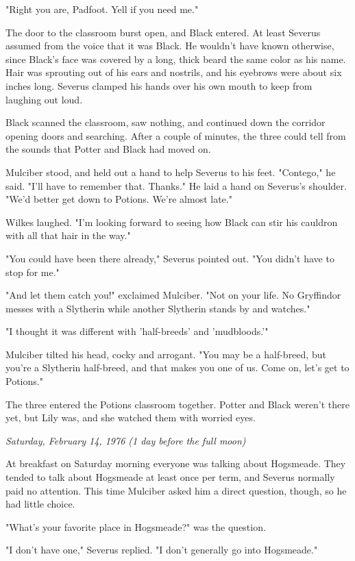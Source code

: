 \documentclass[a4paper,11pt]{article}
\begin{document}
"Right you are, Padfoot. Yell if you need me."

The door to the classroom burst open, and Black entered. At least Severus assumed from the voice that it was Black. He wouldn't have known otherwise, since Black's face was covered by a long, thick beard the same color as his name. Hair was sprouting out of his ears and nostrils, and his eyebrows were about six inches long. Severus clamped his hands over his own mouth to keep from laughing out loud.

Black scanned the classroom, saw nothing, and continued down the corridor opening doors and searching. After a couple of minutes, the three could tell from the sounds that Potter and Black had moved on.

Mulciber stood, and held out a hand to help Severus to his feet. "Contego," he said. "I'll have to remember that. Thanks." He laid a hand on Severus's shoulder. "We'd better get down to Potions. We're almost late."

Wilkes laughed. "I'm looking forward to seeing how Black can stir his cauldron with all that hair in the way."

"You could have been there already," Severus pointed out. "You didn't have to stop for me."

"And let them catch you!" exclaimed Mulciber. "Not on your life. No Gryffindor messes with a Slytherin while another Slytherin stands by and watches."

"I thought it was different with 'half-breeds' and 'mudbloods.'"

Mulciber tilted his head, cocky and arrogant. "You may be a half-breed, but you're a Slytherin half-breed, and that makes you one of us. Come on, let's get to Potions."

The three entered the Potions classroom together. Potter and Black weren't there yet, but Lily was, and she watched them with worried eyes.

\emph{Saturday, February 14, 1976 (1 day before the full moon)}

At breakfast on Saturday morning everyone was talking about Hogsmeade. They tended to talk about Hogsmeade at least once per term, and Severus normally paid no attention. This time Mulciber asked him a direct question, though, so he had little choice.

"What's your favorite place in Hogsmeade?" was the question.

"I don't have one," Severus replied. "I don't generally go into Hogsmeade."
\end{document}
